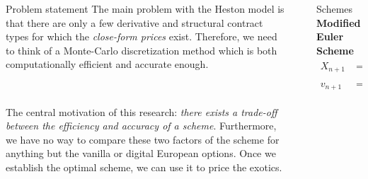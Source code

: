 \documentclass[]{beamer}
\begin{document}
\begin{frame}[t]
\begin{columns}[t]
\begin{column}{\onecolwid}
    \vspace{1.in}
    
    
    \begin{block}{Problem statement}
        The main problem with the Heston model is that there are only a few derivative and structural contract types for which the \emph{close-form prices} exist.
        Therefore, we need to think of a Monte-Carlo discretization method which is both computationally efficient and accurate enough.
        
        \

        The central motivation of this research: \emph{there exists a trade-off between the  efficiency and accuracy of a scheme}.
        Furthermore, we have no way to compare these two factors of the scheme for anything but the vanilla or digital European options.
        Once we establish the optimal scheme, we can use it to price the exotics.
    \end{block}


    
    \end{column} %
    
    \begin{column}{\sepwid}\end{column} %
    
    \begin{column}{\twocolwid} %
    
    \begin{columns}[t,totalwidth=\twocolwid] %
    
    \begin{column}{\onecolwid}\vspace{-.6in} %
    
    
    \begin{block}{Schemes}
    \textbf{Modified Euler Scheme}
    \begin{align}
        X_{n+1} & = X_n + (\mu - 0.5 v_n^+)h_n + \sqrt{v_n^+} \sqrt{h_n} Z_{1,n}, \label{Euler:Heston:price:posmod}\\
        v_{n+1} & = v_n + \kappa\left(\bar v - v_n^+\right) h_n + \gamma \sqrt{v_n^+} \sqrt{h_n} Z_{2,n}. \label{Euler:Heston:variance:posmod}
    \end{align}


\end{block}
\end{column}
\end{columns}
\end{column}
\end{columns}
\end{frame}
\end{document}
